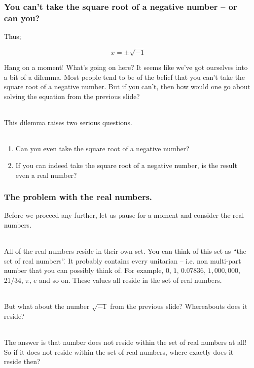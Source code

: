 \begin{frame}
\frametitle{You can't take the square root of a negative number -- or can you?}

Thus;

\begin{equation}
  x = \pm\sqrt{-1}
\end{equation}

Hang on a moment! What's going on here? It seems like we've got ourselves into a bit of a dilemma. Most people tend to be of the belief that you can't
take the square root of a negative number. But if you can't, then how would one go about solving the equation from the previous slide?\\~\

This dilemma raises two serious questions.\\~\

\begin{enumerate}
  \item Can you even take the square root of a negative number?
  \item If you can indeed take the square root of a negative number, is the result even a real number?
\end{enumerate}

\end{frame}


%
%

\begin{frame}
\frametitle{The problem with the real numbers.}

Before we proceed any further, let us pause for a moment and consider the real numbers.\\~\

All of the real numbers reside in their own set. You can think of this set as ``the set of real numbers''. It probably contains every unitarian -- i.e. 
non multi-part number that you can possibly think of. For example, \(0\), \(1\), \(0.07836\), \(1,000,000\), \(21/34\),
\(\pi\), \(e\) and so on. These values all reside in the set of real numbers.\\~\

But what about the number \(\sqrt{-1}\) from the previous slide? Whereabouts does it reside?\\~\

The answer is that number does not reside within the set of real numbers at all! So if it does not reside within the set of real numbers, where exactly
does it reside then?\\~\

\end{frame}


